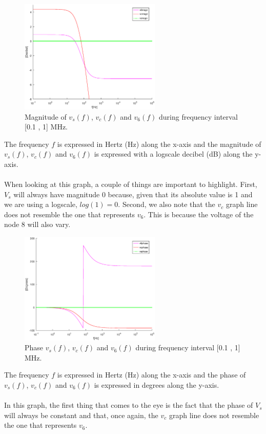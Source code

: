 \begin{figure}[H] \centering
\includegraphics[width=0.6\textwidth]{magnitude.eps}
\caption{Magnitude of $v_s(f)$,  $v_c(f)$  and $v_6(f)$ during frequency interval [0.1 , 1] MHz.}
\label{fig:magnitudetheo}
\end{figure}

The frequency $f$ is expressed in Hertz (Hz) along the x-axis and 
the magnitude of $v_s(f)$,  $v_c(f)$  and $v_6(f)$ is expressed with a logscale decibel (dB) along the y-axis.\\ \\
When looking at this graph, a couple of things are important to highlight. First, $V_s$ will always have magnitude 0 because, given that its absolute value is 1 and we are using a logscale, $log(1)=0$. Second, we also note that the $v_c$ graph line does not resemble the one that represents $v_6$. This is because the voltage of the node 8 will also vary. 


\begin{figure}[H] \centering
\includegraphics[width=0.6\textwidth]{phase.eps}
\caption{Phase $v_s(f)$,  $v_c(f)$  and $v_6(f)$ during frequency interval [0.1 , 1] MHz.}
\label{fig:phasetheo}
\end{figure}

The frequency $f$ is expressed in Hertz (Hz) along the x-axis and
the phase of $v_s(f)$,  $v_c(f)$  and $v_6(f)$ is expressed in degrees along the y-axis.\\ \\
In this graph, the first thing that comes to the eye is the fact that the phase of $V_s$ will always be constant and that, once again, the $v_c$ graph line does not resemble the one that represents $v_6$. 

